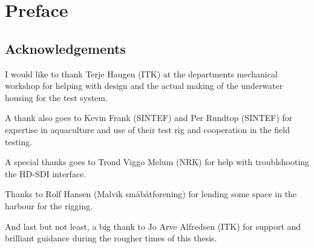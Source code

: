 
\chapter{Preface}


\section{Acknowledgements}

I would like to thank Terje Haugen (ITK) at the departments mechanical workshop for 
helping with design and the actual making of the underwater housing for the test system.

A thank also goes to Kevin Frank (SINTEF) and Per Rundtop (SINTEF) for expertise 
in aquaculture and use of their test rig and cooperation in the field testing. 

A special thanks goes to Trond Viggo Melum (NRK) for help with troublshooting the HD-SDI interface.

Thanks to Rolf Hansen (Malvik småbåtforening) for lending some space in the harbour for the rigging.

And last but not least, a big thank to Jo Arve Alfredsen (ITK) for support and 
brilliant guidance during the rougher times of this thesis.